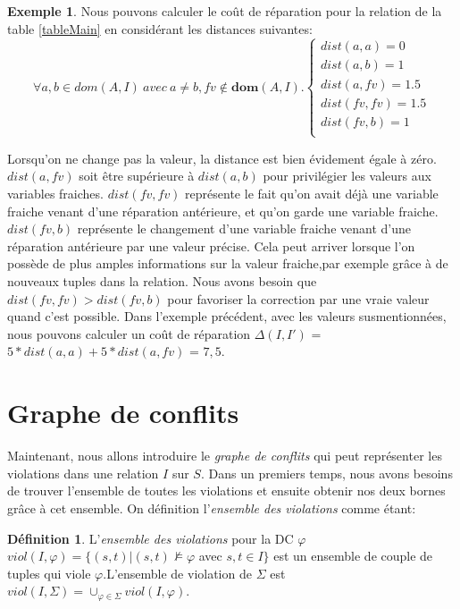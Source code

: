 \documentclass[letterpaper, 12pt]{report}
\theoremstyle{definition}
\newtheorem{mydef}{Définition}
\newtheorem{myexample}{Exemple}
\newcommand{\dom}{\mathbf{dom}}
\begin{document}
\begin{myexample}
\label{exampleDist}
Nous pouvons calculer le coût de réparation pour la relation de la table \ref{tableMain} en considérant les distances suivantes:\\

$$
\forall a,b \in dom(A,I) \ avec \ a \neq b, fv \not\in\dom(A,I).
\left\{
	\begin{array}{ll}
	   dist(a,a)=0\\
	   dist(a,b)=1\\
	   dist(a,fv)=1.5\\
	   dist(fv,fv)=1.5\\
	   dist(fv,b)=1\\
	\end{array}
\right.
$$

Lorsqu'on ne change pas la valeur, la distance est bien évidement égale à zéro. $dist(a,fv)$ soit être supérieure à $dist(a,b)$ pour privilégier les valeurs aux variables fraiches. $dist(fv,fv)$ représente le fait qu'on avait déjà une variable fraiche venant d'une réparation antérieure, et qu'on garde une variable fraiche. $dist(fv,b)$ représente le changement d'une variable fraiche venant d'une réparation antérieure par une valeur précise. Cela peut arriver lorsque l'on possède de plus amples informations sur la valeur fraiche,par exemple grâce à de nouveaux tuples dans la relation. Nous avons besoin que $dist(fv,fv) > dist(fv,b)$ pour favoriser la correction par une vraie valeur quand c'est possible. Dans l'exemple précédent, avec les valeurs susmentionnées, nous pouvons calculer un coût de réparation $\Delta(I,I')$ =$5*dist(a,a) + 5*dist(a,fv)$ = $7,5$.
\end {myexample}


\section{Graphe de conflits}

Maintenant, nous allons introduire le \emph{graphe de conflits} qui peut représenter les violations dans une relation $I$ sur $S$. Dans un premiers temps, nous avons besoins de trouver l'ensemble de toutes les violations et ensuite obtenir nos deux bornes grâce à cet ensemble. On définition l'\emph{ensemble des violations} comme étant: \cite{main}

\begin{mydef}
 L'\emph{ensemble des violations} pour la DC $\varphi$ $viol(I,\varphi) = \{ (s,t) | (s,t) \not\models \varphi $ avec $ s,t \in I \}$ est un ensemble de couple de tuples qui viole $\varphi$.L'ensemble de violation de $\Sigma$ est $viol(I,\Sigma) = \cup_{\varphi \in \Sigma}viol(I,\varphi)$. 
\end{mydef}
\end{document}
